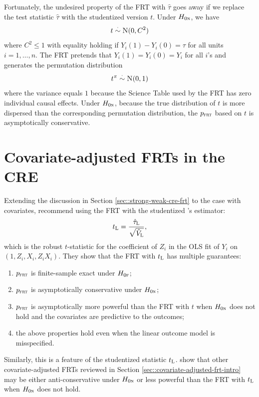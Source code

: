  
Fortunately, the undesired property of the FRT with $\hat\tau$ goes away if we replace the test statistic $\hat{\tau} $ with the studentized version $t$. Under $H_{0\textsc{n}}$, we have
$$
t \stackrel{\cdot}{\sim} \textsc{N}(0,  C^2)
$$ 
where $C^2 \leq 1$ with equality holding if $Y_i(1) - Y_i(0) = \tau$ for all units $i=1, \ldots, n$. The FRT pretends that $Y_i(1) = Y_i(0) = Y_i$ for all $i$'s and generates the permutation distribution
$$
t^\pi \stackrel{\cdot}{\sim} \textsc{N}(0,  1)
$$
where the variance equals $1$ because the Science Table used by the FRT has zero individual causal effects.  Under $H_{0\textsc{n}}$, because the true distribution of $t$ is more dispersed than the corresponding permutation distribution, the $p_{\textsc{frt}}$ based on $t$ is asymptotically conservative. 








 
 
\section{Covariate-adjusted FRTs in the CRE}
 \label{sec::xfrt-cre}
 
Extending the discussion in Section \ref{sec::strong-weak-cre-frt} to the case with covariates, \citet{zhao2020caFRT} recommend using the FRT with the studentized \citet{lin2013}'s estimator:
$$
t_\textsc{L}   =  \frac{  \hat{\tau}_\textsc{L} }{  \sqrt{\hat{V}_\textsc{L}}  },
$$ 
which is the robust $t$-statistic for the coefficient of $Z_i$ in the OLS fit of $Y_i$ on $( 1, Z_i, X_i, Z_i X_i) $. They show that the FRT with $t_\textsc{L} $ has multiple guarantees:
 \begin{enumerate}
\item
 $p_{\textsc{frt}}$ is finite-sample exact under $H_{0\textsc{f}}$;
\item
 $p_{\textsc{frt}}$ is asymptotically conservative under $H_{0\textsc{n}}$;
\item
 $p_{\textsc{frt}}$ is asymptotically more powerful than the FRT with $t$ when $H_{0\textsc{n}}$ does not hold and the covariates are predictive to the outcomes;
\item
the above properties hold even when the linear outcome model is misspecified. 
\end{enumerate}
Similarly, this is a feature of the studentized statistic $t_\textsc{L} $. \citet{zhao2020caFRT} show that other covariate-adjusted FRTs reviewed in Section \ref{sec::covariate-adjusted-frt-intro} may  be either anti-conservative under $H_{0\textsc{n}}$ or less powerful than the FRT with $t_\textsc{L} $ when $H_{0\textsc{n}}$ does not hold.  




